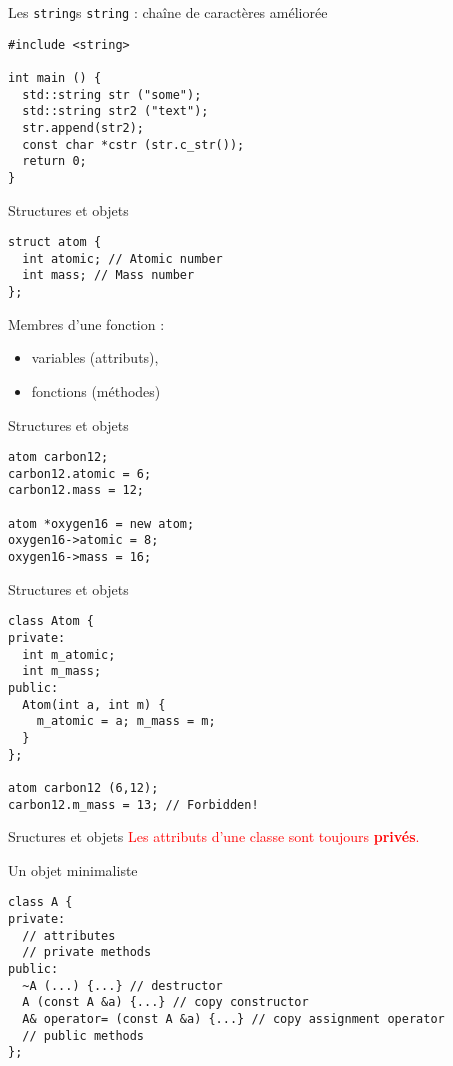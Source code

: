 
\begin{frame}[fragile]{Les \texttt{string}s}
  \texttt{string} : chaîne de caractères améliorée
  \begin{lstlisting}
#include <string>
    
int main () {
  std::string str ("some");
  std::string str2 ("text");
  str.append(str2);
  const char *cstr (str.c_str());
  return 0;
}
    \end{lstlisting}
\end{frame}

\begin{frame}[fragile]{Structures et objets}
  \begin{lstlisting}
struct atom {
  int atomic; // Atomic number
  int mass; // Mass number
};
  \end{lstlisting}

  Membres d'une fonction :
  \begin{itemize}
  \item variables (attributs),
  \item fonctions (méthodes)
  \end{itemize}
\end{frame}

\begin{frame}[fragile]{Structures et objets}
  \begin{lstlisting}
atom carbon12;
carbon12.atomic = 6;
carbon12.mass = 12;

atom *oxygen16 = new atom;
oxygen16->atomic = 8;
oxygen16->mass = 16;
  \end{lstlisting}
\end{frame}

\begin{frame}[fragile]{Structures et objets}
  \begin{lstlisting}
class Atom {
private:
  int m_atomic;
  int m_mass;
public:
  Atom(int a, int m) {
    m_atomic = a; m_mass = m;
  }
};

atom carbon12 (6,12);
carbon12.m_mass = 13; // Forbidden!
  \end{lstlisting}
\end{frame}

\begin{frame}{Sructures et objets}
  \textcolor{red}{Les attributs d'une classe sont toujours \textbf{privés}.}
\end{frame}

\begin{frame}[fragile]{Un objet minimaliste}
  \begin{lstlisting}
class A {
private:
  // attributes
  // private methods
public:
  ~A (...) {...} // destructor
  A (const A &a) {...} // copy constructor
  A& operator= (const A &a) {...} // copy assignment operator
  // public methods
};
  \end{lstlisting}
\end{frame}

